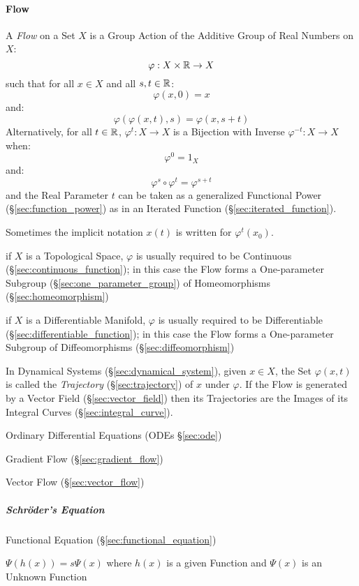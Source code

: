 \begin{itemize}
\paragraph{Flow}\label{sec:flow}\hfill

A \emph{Flow} on a Set $X$ is a Group Action of the Additive Group of Real
Numbers on $X$:
\[
  \varphi : X \times \mathbb{R} \rightarrow X
\]
such that for all $x \in X$ and all $s,t \in \mathbb{R}$:
\[
  \varphi(x,0) = x
\]
and:
\[
  \varphi(\varphi(x,t),s) = \varphi(x,s+t)
\]
Alternatively, for all $t \in \mathbb{R}$, $\varphi^t : X \rightarrow X$ is a
Bijection with Inverse $\varphi^{-t} : X \rightarrow X$ when:
\[
  \varphi^0 = 1_X
\]
and:
\[
  \varphi^s \circ \varphi^t = \varphi^{s + t}
\]
and the Real Parameter $t$ can be taken as a generalized Functional Power
(\S\ref{sec:function_power}) as in an Iterated Function
(\S\ref{sec:iterated_function}).

Sometimes the implicit notation $x(t)$ is written for $\varphi^t(x_0)$.

if $X$ is a Topological Space, $\varphi$ is usually required to be Continuous
(\S\ref{sec:continuous_function}); in this case the Flow forms a One-parameter
Subgroup (\S\ref{sec:one_parameter_group}) of Homeomorphisms
(\S\ref{sec:homeomorphism})

if $X$ is a Differentiable Manifold, $\varphi$ is usually required to be
Differentiable (\S\ref{sec:differentiable_function}); in this case the Flow
forms a One-parameter Subgroup of Diffeomorphisms (\S\ref{sec:diffeomorphism})

In Dynamical Systems (\S\ref{sec:dynamical_system}), given $x \in X$, the Set
$\varphi(x,t)$ is called the \emph{Trajectory} (\S\ref{sec:trajectory}) of $x$
under $\varphi$. If the Flow is generated by a Vector Field
(\S\ref{sec:vector_field}) then its Trajectories are the Images of its Integral
Curves (\S\ref{sec:integral_curve}).

\fist Ordinary Differential Equations (ODEs \S\ref{sec:ode})

\fist Gradient Flow (\S\ref{sec:gradient_flow})

\fist Vector Flow (\S\ref{sec:vector_flow})



\subparagraph{Schr\"oder's Equation}\label{sec:schroders_equation}\hfill

Functional Equation (\S\ref{sec:functional_equation})

$\Psi(h(x)) = s\Psi(x)$ where $h(x)$ is a given Function and $\Psi(x)$ is
an Unknown Function


\end{itemize}
